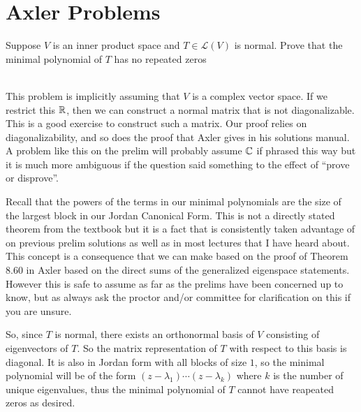 \documentclass[answers]{exam}
\renewcommand{\L}[1]{\mathcal{L}\left(#1\right)}
\begin{document}
\section{Axler Problems}
\begin{questions}
    \question Suppose $V$ is an inner product space and $T\in\L{V}$ is normal. Prove that the minimal polynomial
    of $T$ has no repeated zeros
    \begin{solution}\,\\
         This problem is implicitly assuming that $V$ is a complex vector space. If we restrict this
        $\mathbb{R}$, then we can construct a normal matrix that is not diagonalizable. This is a good exercise to 
        construct such a matrix. Our proof relies on diagonalizability, and so does the proof that Axler gives
        in his solutions manual. A problem like this on the prelim will probably assume $\mathbb{C}$ if phrased this way
        but it is much more ambiguous if the question said something to the effect of ``prove or disprove''.


         Recall that the powers of the terms in our minimal polynomials are the size of the
        largest block in our Jordan Canonical Form. This is not a 
        directly stated theorem from the textbook but it is a fact that 
        is consistently taken advantage of on previous prelim solutions as well as in most lectures that I have
        heard about. This concept is a consequence that we can make based on the proof of Theorem 8.60 in Axler 
        based on the direct sums of the generalized eigenspace statements. However this is safe to assume as 
        far as the prelims have been concerned up to know, but as always ask the proctor and/or committee for 
        clarification on this if you are unsure.

        So, since $T$ is normal, there exists an orthonormal basis of $V$ consisting of eigenvectors of $T$. So
        the matrix representation of $T$ with respect to this basis is diagonal. It is also in Jordan form with
        all blocks of size $1$, so the minimal polynomial will be of the form $(z-\lambda_1)\cdots(z-\lambda_k)$
        where $k$ is the number of unique eigenvalues, thus the minimal polynomial of $T$ cannot have reapeated
        zeros as desired.


\end{solution}
\end{questions}
\end{document}
